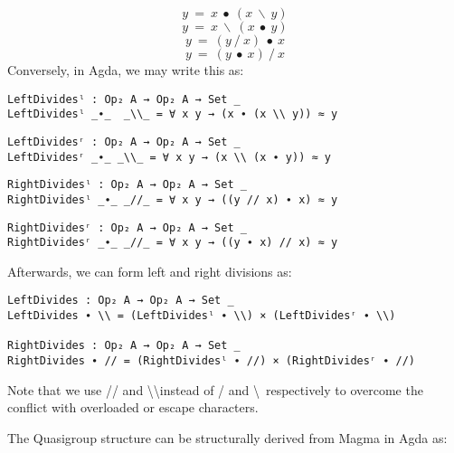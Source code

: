 \begin{equation} \label{eq_L-leftdivides}
y\ =\ x\ ∙\ (x\ \backslash\ y)
\end{equation}
\begin{equation} \label{eq_L-rightdivides}
y\ =\ x\ \backslash\ (x\ ∙\ y)
\end{equation}
\begin{equation} \label{eq_R-leftdivides}
y\ =\ (y\ /\ x)\ ∙\ x
\end{equation}
\begin{equation} \label{eq_Rirightdivides}
y\ =\ (y\ ∙\ x)\ /\ x
\end{equation}
Conversely, in Agda, we may write this as:
\begin{verbatim}
LeftDividesˡ : Op₂ A → Op₂ A → Set _
LeftDividesˡ _∙_  _\\_ = ∀ x y → (x ∙ (x \\ y)) ≈ y
\end{verbatim}
\begin{verbatim}
LeftDividesʳ : Op₂ A → Op₂ A → Set _
LeftDividesʳ _∙_ _\\_ = ∀ x y → (x \\ (x ∙ y)) ≈ y
\end{verbatim}
\begin{verbatim}
RightDividesˡ : Op₂ A → Op₂ A → Set _
RightDividesˡ _∙_ _//_ = ∀ x y → ((y // x) ∙ x) ≈ y
\end{verbatim}
\begin{verbatim}
RightDividesʳ : Op₂ A → Op₂ A → Set _
RightDividesʳ _∙_ _//_ = ∀ x y → ((y ∙ x) // x) ≈ y
\end{verbatim}

Afterwards, we can form left and right divisions as:

\begin{verbatim}
LeftDivides : Op₂ A → Op₂ A → Set _
LeftDivides ∙ \\ = (LeftDividesˡ ∙ \\) × (LeftDividesʳ ∙ \\)

RightDivides : Op₂ A → Op₂ A → Set _
RightDivides ∙ // = (RightDividesˡ ∙ //) × (RightDividesʳ ∙ //)
\end{verbatim}

Note that we use // and \textbackslash\textbackslash instead of / and
\textbackslash \ respectively to overcome the conflict with overloaded or escape
characters. 

The Quasigroup structure can be structurally derived from Magma in Agda as:


